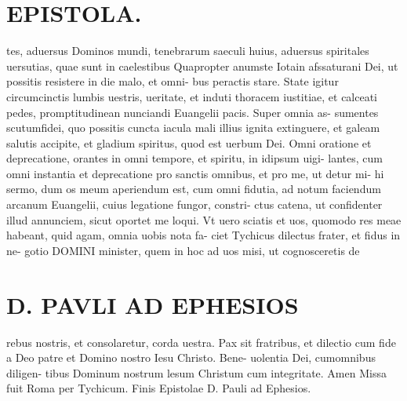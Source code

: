 \documentclass{article}
\begin{document}
\begin{pages}
\section*{EPISTOLA.  }
\marginpar{[ p.10.  ]}
\marginpar{[ p.]}
\marginpar{[ p.]}
\marginpar{[ p.]}\pstart tes, aduersus Dominos mundi, tenebrarum saeculi huius, aduersus spiritales uersutias, quae sunt in caelestibus  \pend\pstart Quapropter anumste Iotain afssaturani Dei, ut possitis resistere in die malo, et omni- bus peractis stare. State igitur circumcinctis lumbis uestris, ueritate, et induti thoracem iustitiae, et calceati pedes, promptitudinean nunciandi Euangelii pacis. Super omnia as- sumentes scutumfidei, quo possitis cuncta iacula mali illius ignita extinguere, et galeam salutis accipite, et gladium spiritus, quod est uerbum Dei.  \pend\pstart Omni oratione et deprecatione, orantes in omni tempore, et spiritu, in idipsum uigi- lantes, cum omni instantia et deprecatione pro sanctis omnibus, et pro me, ut detur mi- hi sermo, dum os meum aperiendum est, cum omni fidutia, ad notum faciendum arcanum Euangelii, cuius legatione fungor, constri- ctus catena, ut confidenter illud annunciem, sicut oportet me loqui.  \pend\pstart Vt uero sciatis et uos, quomodo res meae habeant, quid agam, omnia uobis nota fa- ciet Tychicus dilectus frater, et fidus in ne- gotio DOMINI minister, quem in hoc ad uos misi, ut cognosceretis de  \pend
\section*{D. PAVLI AD EPHESIOS }
\marginpar{[ p.9.  ]}\pstart rebus nostris, et consolaretur, corda uestra.  Pax sit fratribus, et dilectio cum fide a Deo patre et Domino nostro Iesu Christo. Bene- uolentia Dei, cumomnibus diligen- tibus Dominum nostrum lesum Christum cum integritate. Amen Missa fuit Roma per Tychicum. Finis Epistolae D. Pauli ad Ephesios.  \pend

\end{pages}
\end{document}
